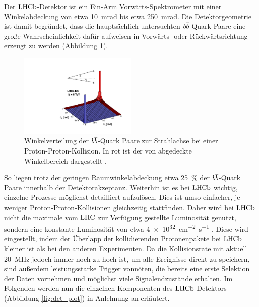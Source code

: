 Der $\mbox{LHCb}$-Detektor ist ein Ein-Arm Vorwärts-Spektrometer mit einer Winkelabdeckung von etwa \SI{10}{mrad} bis etwa \SI{250}{mrad}. Die Detektorgeometrie ist damit begründet, dass die hauptsächlich untersuchten ${{b}{\overline {{b}}}}$-Quark Paare eine große Wahrscheinlichkeit dafür aufweisen in Vorwärts- oder Rückwärtsrichtung erzeugt zu werden (Abbildung \ref{fig:angle_plot}).  
\begin{figure}[htpb]
	\centering
		\includegraphics[width=0.5\textwidth]{fig/angle_plot.pdf}
	\caption{Winkelverteilung der ${{b}{\overline {{b}}}}$-Quark Paare zur Strahlachse bei einer Proton-Proton-Kollision. In rot ist der von \lhcb abgedeckte Winkelbereich dargestellt \cite{angle_plot}.}
	\label{fig:angle_plot} 
\end{figure} 
So liegen trotz der geringen Raumwinkelabdeckung etwa \SI{25}{\%} der ${{b}{\overline {{b}}}}$-Quark Paare innerhalb der Detektorakzeptanz. Weiterhin ist es bei $\mbox{LHCb}$ wichtig, einzelne Prozesse möglichst detailliert aufzulösen. Dies ist umso einfacher, je weniger Proton-Proton-Kollisionen gleichzeitig stattfinden. Daher wird bei $\mbox{LHCb}$ nicht die maximale vom $\mbox{LHC}$ zur Verfügung gestellte Luminosität genutzt, sondern eine konstante Luminosität von etwa \SI[exponent-product = \cdot]{4e32}{cm^{-2}s^{-1}} \cite{LHC_statistik}. Diese wird eingestellt, indem der Überlapp der kollidierenden Protonenpakete bei $\mbox{LHCb}$ kleiner ist als bei den anderen Experimenten. Da die Kollisionsrate mit aktuell \SI{20}{MHz} jedoch immer noch zu hoch ist, um alle Ereignisse direkt zu speichern, sind außerdem leistungsstarke Trigger vonnöten, die bereits eine erste Selektion der Daten vornehmen und möglichst viele Signalendzustände erhalten. Im Folgenden werden nun die einzelnen Komponenten des $\mbox{LHCb}$-Detektors (Abbildung \ref{fig:det_plot}) in Anlehnung an \cite{Alves:2008zz}  erläutert.
